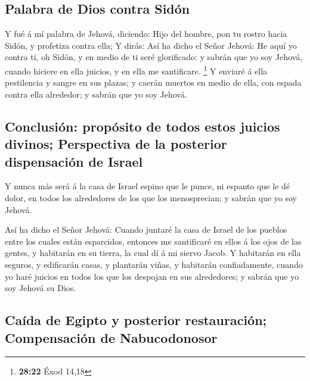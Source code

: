 \hypertarget{palabra-de-dios-contra-siduxf3n}{%
\subsection{Palabra de Dios contra
Sidón}\label{palabra-de-dios-contra-siduxf3n}}

 Y fué á mí palabra de Jehová, diciendo:  Hijo
del hombre, pon tu rostro hacia Sidón, y profetiza contra ella;
 Y dirás: Así ha dicho el Señor Jehová: He aquí yo contra
ti, oh Sidón, y en medio de ti seré glorificado: y sabrán que yo soy
Jehová, cuando hiciere en ella juicios, y en ella me santificare.
\footnote{\textbf{28:22} Éxod 14,18}  Y enviaré á ella
pestilencia y sangre en sus plazas; y caerán muertos en medio de ella,
con espada contra ella alrededor; y sabrán que yo soy Jehová.

\hypertarget{conclusiuxf3n-propuxf3sito-de-todos-estos-juicios-divinos-perspectiva-de-la-posterior-dispensaciuxf3n-de-israel}{%
\subsection{Conclusión: propósito de todos estos juicios divinos;
Perspectiva de la posterior dispensación de
Israel}\label{conclusiuxf3n-propuxf3sito-de-todos-estos-juicios-divinos-perspectiva-de-la-posterior-dispensaciuxf3n-de-israel}}

 Y nunca más será á la casa de Israel espino que le punce,
ni espanto que le dé dolor, en todos los alrededores de los que los
menosprecian; y sabrán que yo soy Jehová.

 Así ha dicho el Señor Jehová: Cuando juntaré la casa de
Israel de los pueblos entre los cuales están esparcidos, entonces me
santificaré en ellos á los ojos de las gentes, y habitarán en su tierra,
la cual dí á mi siervo Jacob.  Y habitarán en ella seguros,
y edificarán casas, y plantarán viñas, y habitarán confiadamente, cuando
yo haré juicios en todos los que los despojan en sus alrededores; y
sabrán que yo soy Jehová su Dios.

\hypertarget{cauxedda-de-egipto-y-posterior-restauraciuxf3n-compensaciuxf3n-de-nabucodonosor}{%
\subsection{Caída de Egipto y posterior restauración; Compensación de
Nabucodonosor}\label{cauxedda-de-egipto-y-posterior-restauraciuxf3n-compensaciuxf3n-de-nabucodonosor}}

